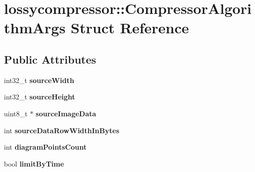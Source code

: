 \hypertarget{structlossycompressor_1_1_compressor_algorithm_args}{}\section{lossycompressor\+:\+:Compressor\+Algorithm\+Args Struct Reference}
\label{structlossycompressor_1_1_compressor_algorithm_args}
\subsection*{Public Attributes}
\begin{DoxyCompactItemize}
\item 
int32\+\_\+t {\bfseries source\+Width}\hypertarget{structlossycompressor_1_1_compressor_algorithm_args_a4655a3720898b5092db2e79d83d1fcab}{}\label{structlossycompressor_1_1_compressor_algorithm_args_a4655a3720898b5092db2e79d83d1fcab}

\item 
int32\+\_\+t {\bfseries source\+Height}\hypertarget{structlossycompressor_1_1_compressor_algorithm_args_a4f48ea48d4ff07cebb3f5491bde8e9cd}{}\label{structlossycompressor_1_1_compressor_algorithm_args_a4f48ea48d4ff07cebb3f5491bde8e9cd}

\item 
uint8\+\_\+t $\ast$ {\bfseries source\+Image\+Data}\hypertarget{structlossycompressor_1_1_compressor_algorithm_args_ab36086d4191f6b08563d3fa29bcdef93}{}\label{structlossycompressor_1_1_compressor_algorithm_args_ab36086d4191f6b08563d3fa29bcdef93}

\item 
int {\bfseries source\+Data\+Row\+Width\+In\+Bytes}\hypertarget{structlossycompressor_1_1_compressor_algorithm_args_ae0be85eced6f0306dcc2a28ee1ac0683}{}\label{structlossycompressor_1_1_compressor_algorithm_args_ae0be85eced6f0306dcc2a28ee1ac0683}

\item 
int {\bfseries diagram\+Points\+Count}\hypertarget{structlossycompressor_1_1_compressor_algorithm_args_a6e2ecb59e8847f2f191025c620bff0f8}{}\label{structlossycompressor_1_1_compressor_algorithm_args_a6e2ecb59e8847f2f191025c620bff0f8}

\item 
bool {\bfseries limit\+By\+Time}\hypertarget{structlossycompressor_1_1_compressor_algorithm_args_af3425dd0187e688780df098b1d2eff56}{}\label{structlossycompressor_1_1_compressor_algorithm_args_af3425dd0187e688780df098b1d2eff56}


\end{DoxyCompactItemize}
